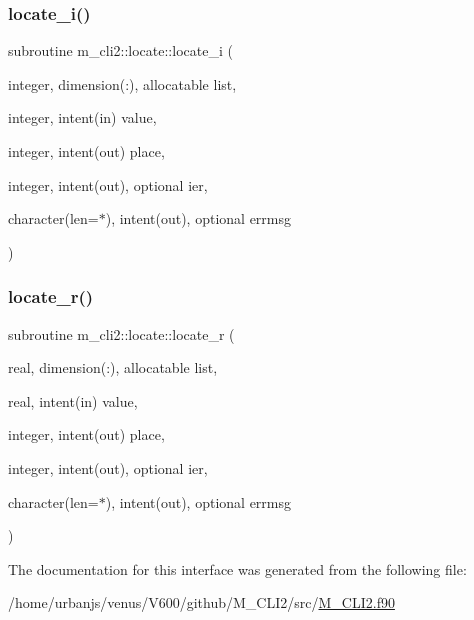 \subsubsection{\texorpdfstring{locate\+\_\+i()}{locate\_i()}}
{\footnotesize\ttfamily subroutine m\+\_\+cli2\+::locate\+::locate\+\_\+i (\begin{DoxyParamCaption}\item[{integer, dimension(\+:), allocatable}]{list,  }\item[{integer, intent(in)}]{value,  }\item[{integer, intent(out)}]{place,  }\item[{integer, intent(out), optional}]{ier,  }\item[{character(len=$\ast$), intent(out), optional}]{errmsg }\end{DoxyParamCaption})\hspace{0.3cm}{\ttfamily [private]}}

\mbox{\label{interfacem__cli2_1_1locate_a93368b61603fe74c498b1190a502c271}} 
\subsubsection{\texorpdfstring{locate\+\_\+r()}{locate\_r()}}
{\footnotesize\ttfamily subroutine m\+\_\+cli2\+::locate\+::locate\+\_\+r (\begin{DoxyParamCaption}\item[{real, dimension(\+:), allocatable}]{list,  }\item[{real, intent(in)}]{value,  }\item[{integer, intent(out)}]{place,  }\item[{integer, intent(out), optional}]{ier,  }\item[{character(len=$\ast$), intent(out), optional}]{errmsg }\end{DoxyParamCaption})\hspace{0.3cm}{\ttfamily [private]}}



The documentation for this interface was generated from the following file\+:\begin{DoxyCompactItemize}
\item 
/home/urbanjs/venus/\+V600/github/\+M\+\_\+\+C\+L\+I2/src/\mbox{\hyperlink{M__CLI2_8f90}{M\+\_\+\+C\+L\+I2.\+f90}}\end{DoxyCompactItemize}
